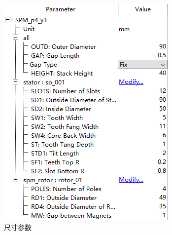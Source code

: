 \documentclass{thuemp}
\begin{document}
\begin{figure}[H]
  \centering
  \includegraphics[width=1\linewidth]{./img/task1/model1-config2.png}
  \caption{尺寸参数}
\end{figure}
\end{document}
